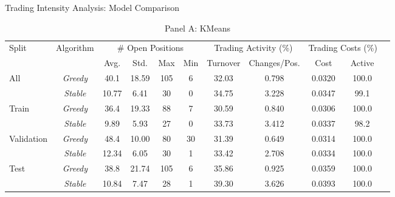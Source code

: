 
\begin{table}[htbp] 
\caption{Trading Intensity Analysis: Model Comparison} 
\centering 
\label{tab:trading_intensity_comparison}

\begin{subtable}{\textwidth}
\caption{Panel A: KMeans}
\centering 
{\small
\begin{tabular}{lcccccccccc}
\toprule
Split & Algorithm & \multicolumn{4}{c}{\# Open Positions} & \multicolumn{2}{c}{Trading Activity (\%)} & \multicolumn{2}{c}{Trading Costs (\%)} \\
\cmidrule(lr{0.6em}){3-6} \cmidrule(lr{0.6em}){7-8} \cmidrule(lr{0.6em}){9-10}
& & Avg. & Std. & Max & Min & Turnover & Changes/Pos. & Cost & Active \\
\midrule
\multirow{2}{*}{All} & \textit{Greedy} & 40.1 & 18.59 & 105 & 6 & 32.03 & 0.798 & 0.0320 & 100.0 \\
 & \textit{Stable} & 10.77 & 6.41 & 30 & 0 & 34.75 & 3.228 & 0.0347 & 99.1 \\
\midrule
\multirow{2}{*}{Train} & \textit{Greedy} & 36.4 & 19.33 & 88 & 7 & 30.59 & 0.840 & 0.0306 & 100.0 \\
 & \textit{Stable} & 9.89 & 5.93 & 27 & 0 & 33.73 & 3.412 & 0.0337 & 98.2 \\
\midrule
\multirow{2}{*}{Validation} & \textit{Greedy} & 48.4 & 10.00 & 80 & 30 & 31.39 & 0.649 & 0.0314 & 100.0 \\
 & \textit{Stable} & 12.34 & 6.05 & 30 & 1 & 33.42 & 2.708 & 0.0334 & 100.0 \\
\midrule
\multirow{2}{*}{Test} & \textit{Greedy} & 38.8 & 21.74 & 105 & 6 & 35.86 & 0.925 & 0.0359 & 100.0 \\
 & \textit{Stable} & 10.84 & 7.47 & 28 & 1 & 39.30 & 3.626 & 0.0393 & 100.0 \\
\bottomrule
\end{tabular}
}
\end{subtable}
\end{table}
